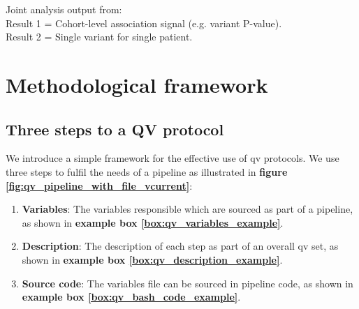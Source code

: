 \begin{tcolorbox}[
    colback=white!0,  %
    colframe=black,  %
    boxrule=1pt,  %
    arc=1mm,  %
    outer arc=1mm,
   title=\textbf{\refstepcounter{myboxcounter}\label{box:pipe}Box \themyboxcounter: Example diagrammatic representation}
]


Joint analysis output from:\\
Result 1 = Cohort-level association signal (e.g. variant P-value). \\
Result 2 = Single variant for single patient.
\end{tcolorbox}


\section{Methodological framework}
\subsection{Three steps to a QV protocol}
We introduce 
a simple framework for the effective use of \ac{qv} protocols.
We use three steps to fulfil the needs of a pipeline as illustrated in 
\textbf{figure 
\ref{fig:qv_pipeline_with_file_vcurrent}}:
\begin{enumerate}
\item \textbf{Variables}: The variables responsible which are sourced as part of a pipeline, as shown in \textbf{example box \ref{box:qv_variables_example}}.
\item \textbf{Description}: The description of each step as part of an overall \ac{qv} set, as shown in \textbf{example box \ref{box:qv_description_example}}.
\item \textbf{Source code}: The variables file can be sourced in pipeline code, as shown in \textbf{example box \ref{box:qv_bash_code_example}}.
\end{enumerate}

